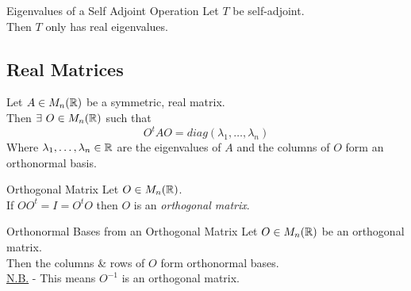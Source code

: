 \documentclass[11pt,a4paper]{article}
\begin{document}
\subtitle{Theorem 10.14 - }{Eigenvalues of a Self Adjoint Operation}
Let $T$ be self-adjoint.\\
Then $T$ only has real eigenvalues.

\subsection{Real Matrices}

\subtitle{Theorem 10.15 - }{}
Let $A \in M_n(\mathbb{R})$ be a symmetric, real matrix.\\
Then $\exists\ O \in M_n(\mathbb{R})$ such that
$$O^tAO = diag(\lambda_1, \dots, \lambda_n)$$
Where $\lambda_1, \dots, \lambda_n \in \mathbb{R}$ are the eigenvalues of $A$ and the columns of $O$ form an orthonormal basis.\\

\subtitle{Definition 10.16 - }{Orthogonal Matrix}
Let $O \in M_n(\mathbb{R})$.\\
If $OO^t = I = O^tO$ then $O$ is an \textit{orthogonal matrix}.\\

\subtitle{Remark 10.17 - }{Orthonormal Bases from an Orthogonal Matrix}
Let $O \in M_n(\mathbb{R})$ be an orthogonal matrix.\\
Then the columns \& rows of $O$ form orthonormal bases.\\
\underline{N.B.} - This means $O^{-1}$ is an orthogonal matrix.
\end{document}
